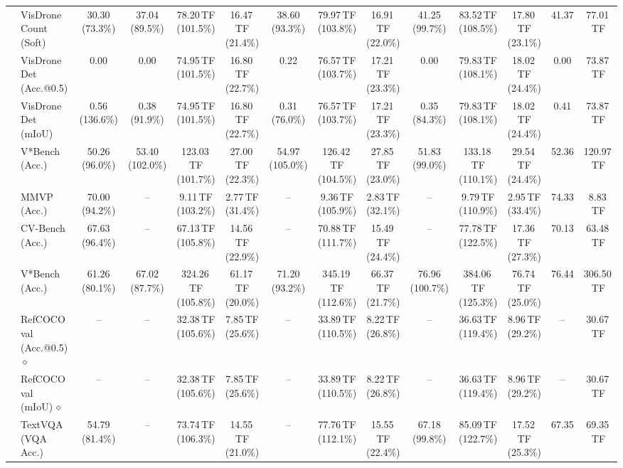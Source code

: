 \begin{table}[t]
\begin{center}
\begin{small}
\begin{sc}
{\begin{tabular}{llcccccccccccc}
& VisDrone Count (Soft) & 30.30 (73.3\%) & 37.04 (89.5\%) & 78.20\,TF (101.5\%) & 16.47\,TF (21.4\%) & 38.60 (93.3\%) & 79.97\,TF (103.8\%) & 16.91\,TF (22.0\%) & 41.25 (99.7\%) & 83.52\,TF (108.5\%) & 17.80\,TF (23.1\%) & 41.37 & 77.01\,TF \\
& VisDrone Det (Acc.@0.5) & 0.00 & 0.00 & 74.95\,TF (101.5\%) & 16.80\,TF (22.7\%) & 0.22 & 76.57\,TF (103.7\%) & 17.21\,TF (23.3\%) & 0.00 & 79.83\,TF (108.1\%) & 18.02\,TF (24.4\%) & 0.00 & 73.87\,TF \\
& VisDrone Det (mIoU) & 0.56 (136.6\%) & 0.38 (91.9\%) & 74.95\,TF (101.5\%) & 16.80\,TF (22.7\%) & 0.31 (76.0\%) & 76.57\,TF (103.7\%) & 17.21\,TF (23.3\%) & 0.35 (84.3\%) & 79.83\,TF (108.1\%) & 18.02\,TF (24.4\%) & 0.41 & 73.87\,TF \\
& V*Bench (Acc.) & 50.26 (96.0\%) & 53.40 (102.0\%) & 123.03\,TF (101.7\%) & 27.00\,TF (22.3\%) & 54.97 (105.0\%) & 126.42\,TF (104.5\%) & 27.85\,TF (23.0\%) & 51.83 (99.0\%) & 133.18\,TF (110.1\%) & 29.54\,TF (24.4\%) & 52.36 & 120.97\,TF \\
\midrule
{}
& MMVP (Acc.) & 70.00 (94.2\%) & -- & 9.11\,TF (103.2\%) & 2.77\,TF (31.4\%) & -- & 9.36\,TF (105.9\%) & 2.83\,TF (32.1\%) & -- & 9.79\,TF (110.9\%) & 2.95\,TF (33.4\%) & 74.33 & 8.83\,TF \\
& CV-Bench (Acc.) & 67.63 (96.4\%) & -- & 67.13\,TF (105.8\%) & 14.56\,TF (22.9\%) & -- & 70.88\,TF (111.7\%) & 15.49\,TF (24.4\%) & -- & 77.78\,TF (122.5\%) & 17.36\,TF (27.3\%) & 70.13 & 63.48\,TF \\
& V*Bench (Acc.) & 61.26 (80.1\%) & 67.02 (87.7\%) & 324.26\,TF (105.8\%) & 61.17\,TF (20.0\%) & 71.20 (93.2\%) & 345.19\,TF (112.6\%) & 66.37\,TF (21.7\%) & 76.96 (100.7\%) & 384.06\,TF (125.3\%) & 76.74\,TF (25.0\%) & 76.44 & 306.50\,TF \\
& RefCOCO val (Acc.@0.5)\,$\diamond$ & -- & -- & 32.38\,TF (105.6\%) & 7.85\,TF (25.6\%) & -- & 33.89\,TF (110.5\%) & 8.22\,TF (26.8\%) & -- & 36.63\,TF (119.4\%) & 8.96\,TF (29.2\%) & -- & 30.67\,TF \\
& RefCOCO val (mIoU)\,$\diamond$ & -- & -- & 32.38\,TF (105.6\%) & 7.85\,TF (25.6\%) & -- & 33.89\,TF (110.5\%) & 8.22\,TF (26.8\%) & -- & 36.63\,TF (119.4\%) & 8.96\,TF (29.2\%) & -- & 30.67\,TF \\
& TextVQA (VQA Acc.) & 54.79 (81.4\%) & -- & 73.74\,TF (106.3\%) & 14.55\,TF (21.0\%) & -- & 77.76\,TF (112.1\%) & 15.55\,TF (22.4\%) & 67.18 (99.8\%) & 85.09\,TF (122.7\%) & 17.52\,TF (25.3\%) & 67.35 & 69.35\,TF \\

\end{tabular}}
\end{sc}
\end{small}
\end{center}
\end{table}
